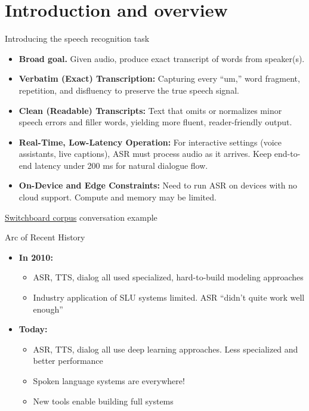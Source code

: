 \section{Introduction and overview}

\begin{frame}{Introducing the speech recognition task}
  \begin{itemize}
    \item \textbf{Broad goal.} Given audio, produce exact transcript of words from speaker(s).
    \item \textbf{Verbatim (Exact) Transcription:} Capturing every ``um,'' word fragment, repetition, and disfluency to preserve the true speech signal.
    \item \textbf{Clean (Readable) Transcripts:} Text that omits or normalizes minor speech errors and filler words, yielding more fluent, reader-friendly output.
    \item \textbf{Real-Time, Low-Latency Operation:} For interactive settings (voice assistants, live captions), ASR must process audio as it arrives. Keep end-to-end latency under 200 ms for natural dialogue flow.
    \item \textbf{On-Device and Edge Constraints:} Need to run ASR on devices with no cloud support. Compute and memory may be limited.
  \end{itemize}
  \vspace{0.5em}
  
  \footnotesize\href{https://catalog.ldc.upenn.edu/LDC97S62}{Switchboard corpus} conversation example
\end{frame}

\begin{frame}{Arc of Recent History}
  \begin{itemize}
    \item \textbf{In 2010:}
    \begin{itemize}
      \item ASR, TTS, dialog all used specialized, hard-to-build modeling approaches
      \item Industry application of SLU systems limited. ASR ``didn't quite work well enough''
    \end{itemize}
    \item \textbf{Today:}
    \begin{itemize}
      \item ASR, TTS, dialog all use deep learning approaches. Less specialized and better performance
      \item Spoken language systems are everywhere!
      \item New tools enable building full systems
    \end{itemize}
  \end{itemize}
\end{frame}

